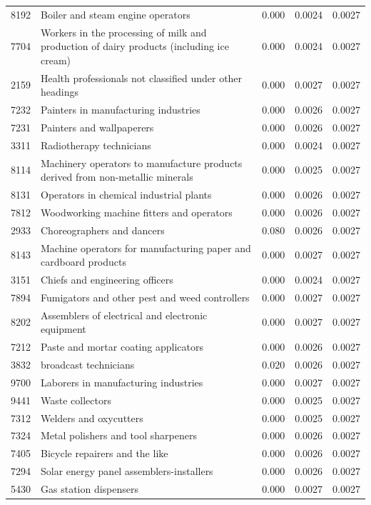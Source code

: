 \begin{longtable}{p{}>{\raggedright\arraybackslash}p{}rrr}
8192 & Boiler and steam engine operators & 0.000 & 0.0024 & 0.0027 \\
7704 & Workers in the processing of milk and production of dairy products (including ice cream) & 0.000 & 0.0024 & 0.0027 \\
2159 & Health professionals not classified under other headings & 0.000 & 0.0027 & 0.0027 \\
7232 & Painters in manufacturing industries & 0.000 & 0.0026 & 0.0027 \\
7231 & Painters and wallpaperers & 0.000 & 0.0026 & 0.0027 \\
3311 & Radiotherapy technicians & 0.000 & 0.0024 & 0.0027 \\
8114 & Machinery operators to manufacture products derived from non-metallic minerals & 0.000 & 0.0025 & 0.0027 \\
8131 & Operators in chemical industrial plants & 0.000 & 0.0026 & 0.0027 \\
7812 & Woodworking machine fitters and operators & 0.000 & 0.0026 & 0.0027 \\
2933 & Choreographers and dancers & 0.080 & 0.0026 & 0.0027 \\
8143 & Machine operators for manufacturing paper and cardboard products & 0.000 & 0.0027 & 0.0027 \\
3151 & Chiefs and engineering officers & 0.000 & 0.0024 & 0.0027 \\
7894 & Fumigators and other pest and weed controllers & 0.000 & 0.0027 & 0.0027 \\
8202 & Assemblers of electrical and electronic equipment & 0.000 & 0.0027 & 0.0027 \\
7212 & Paste and mortar coating applicators & 0.000 & 0.0026 & 0.0027 \\
3832 & broadcast technicians & 0.020 & 0.0026 & 0.0027 \\
9700 & Laborers in manufacturing industries & 0.000 & 0.0027 & 0.0027 \\
9441 & Waste collectors & 0.000 & 0.0025 & 0.0027 \\
7312 & Welders and oxycutters & 0.000 & 0.0025 & 0.0027 \\
7324 & Metal polishers and tool sharpeners & 0.000 & 0.0026 & 0.0027 \\
7405 & Bicycle repairers and the like & 0.000 & 0.0026 & 0.0027 \\
7294 & Solar energy panel assemblers-installers & 0.000 & 0.0026 & 0.0027 \\
5430 & Gas station dispensers & 0.000 & 0.0027 & 0.0027 \\

\end{longtable}
